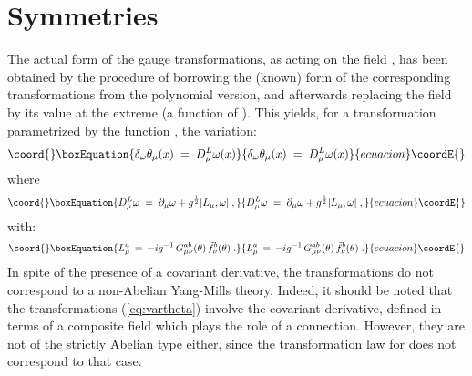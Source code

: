 \documentclass[a4paper,12pt]{article}
\begin{document}
\section{Symmetries}\label{sec:gauge}
The actual form of the gauge transformations, as acting on the field
\myHighlight{$\theta_\mu$}\coordHE{}, has been obtained by the procedure of borrowing the
(known) form of the corresponding transformations from the polynomial
version, and afterwards replacing the field \coordHE{} by its value at
the extreme (a function of \myHighlight{$\theta$}\coordHE{}). This yields, for a
transformation parametrized by the function \coordHE{}, the
variation:
\begin{equation}\coord{}\boxEquation{\label{eq:vartheta}
\delta_\omega \theta_\mu(x) \;=\; D^L_\mu \omega(x)
}{\delta_\omega \theta_\mu(x) \;=\; D^L_\mu \omega(x)
}{ecuacion}\coordE{}\end{equation}
where
\begin{equation}\coord{}\boxEquation{\label{eq:defdl}
D^L_\mu \omega \;=\; \partial_\mu \omega + g^{\frac{1}{2}} [L_\mu,\omega] \;,  
}{D^L_\mu \omega \;=\; \partial_\mu \omega + g^{\frac{1}{2}} [L_\mu,\omega] \;,  
}{ecuacion}\coordE{}\end{equation}
with: 
\begin{equation}\coord{}\boxEquation{\label{eq:loft}
L_\mu^a \,=\, -i g^{-1} \, G_{\mu\nu}^{ab}(\theta)\, {\tilde f}_\nu^b (\theta)\;.
}{L_\mu^a \,=\, -i g^{-1} \, G_{\mu\nu}^{ab}(\theta)\, {\tilde f}_\nu^b (\theta)\;.
}{ecuacion}\coordE{}\end{equation}
In spite of the presence of a covariant derivative, the
transformations do not correspond to a non-Abelian Yang-Mills theory.
Indeed, it should be noted that the transformations
(\ref{eq:vartheta}) involve the covariant derivative, defined in terms
of a composite field which plays the role of a connection.  However,
they are not of the strictly Abelian type either, since the
transformation law for \myHighlight{$\theta$}\coordHE{} does not correspond to that case.
\end{document}
